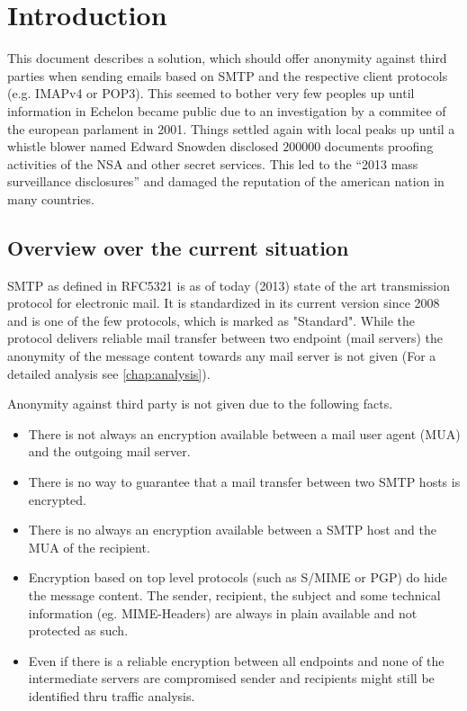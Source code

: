 \chapter{Introduction}
This document describes a solution, which should offer anonymity against third parties when sending emails based on SMTP and the respective client protocols (e.g. IMAPv4 or POP3). This seemed to bother very few peoples up until information in Echelon became public due to an investigation by a commitee of the european parlament in 2001\cite{ECHELON}. Things settled again with local peaks up until a whistle blower named Edward Snowden disclosed $200000$ documents proofing activities of the NSA and other secret services. This led to the ``2013 mass surveillance disclosures'' and damaged the reputation of the american nation in many countries\cite{wiki:edward_snowden}.

\section{Overview over the current situation}
SMTP as defined in RFC5321\cite{RFC5321} is as of today (2013)  state of the art transmission protocol for electronic mail. It is standardized in its current version since 2008 and is one of the few protocols, which is marked as "Standard". While the protocol delivers reliable mail transfer between two endpoint (mail servers) the anonymity of the message content towards any mail server is not given (For a detailed analysis see \ref{chap:analysis}).\par

Anonymity against third party is not given due to the following facts.

\begin{itemize}
  \item There is not always an encryption available between a mail user agent (MUA) and the outgoing mail server.
	\item There is no way to guarantee that a mail transfer between two SMTP hosts is encrypted.
	\item There is no always an encryption available between a SMTP host and the MUA of the recipient.
  \item Encryption based on top level protocols (such as S/MIME or PGP) do hide the message content. The sender, recipient, the subject and some technical information (eg. MIME-Headers) are always in plain available and not protected as such.
	\item Even if there is a reliable encryption between all endpoints and none of the intermediate servers are compromised sender and recipients might still be identified thru traffic analysis.
\end{itemize}

